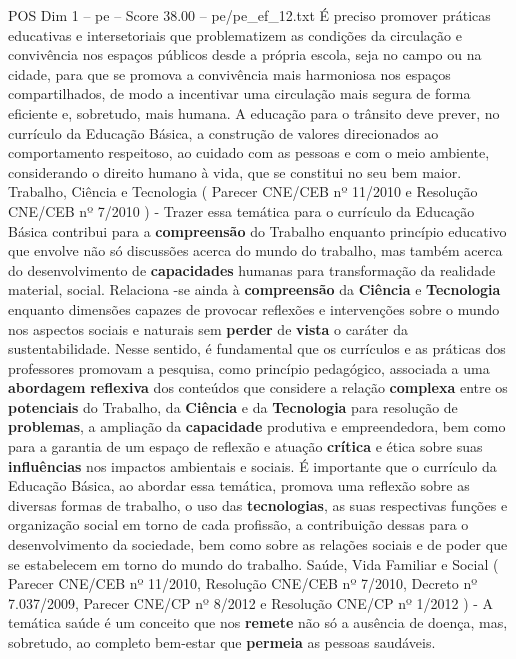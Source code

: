 \begin{textsample}{POS Dim 1 – pe – Score 38.00 – pe/pe\_ef\_12.txt}
É preciso promover práticas educativas e intersetoriais que problematizem as condições da circulação e convivência nos espaços públicos desde a própria escola, seja no campo ou na cidade, para que se promova a convivência mais harmoniosa nos espaços compartilhados, de modo a incentivar uma circulação mais segura de forma eficiente e, sobretudo, mais humana.
A educação para o trânsito deve prever, no currículo da Educação Básica, a construção de valores direcionados ao comportamento respeitoso, ao cuidado com as pessoas e com o meio ambiente, considerando o direito humano à vida, que se constitui no seu bem maior.
Trabalho, Ciência e Tecnologia ( Parecer CNE/CEB nº 11/2010 e Resolução CNE/CEB nº 7/2010 ) - Trazer essa temática para o currículo da Educação Básica contribui para a \textbf{compreensão} do Trabalho enquanto princípio educativo que envolve não só discussões acerca do mundo do trabalho, mas também acerca do desenvolvimento de \textbf{capacidades} humanas para transformação da realidade material, social.
Relaciona -se ainda à \textbf{compreensão} da \textbf{Ciência} e \textbf{Tecnologia} enquanto dimensões capazes de provocar reflexões e intervenções sobre o mundo nos aspectos sociais e naturais sem \textbf{perder} de \textbf{vista} o caráter da sustentabilidade.
Nesse sentido, é fundamental que os currículos e as práticas dos professores promovam a pesquisa, como princípio pedagógico, associada a uma \textbf{abordagem} \textbf{reflexiva} dos conteúdos que considere a relação \textbf{complexa} entre os \textbf{potenciais} do Trabalho, da \textbf{Ciência} e da \textbf{Tecnologia} para resolução de \textbf{problemas}, a ampliação da \textbf{capacidade} produtiva e empreendedora, bem como para a garantia de um espaço de reflexão e atuação \textbf{crítica} e ética sobre suas \textbf{influências} nos impactos ambientais e sociais.
É importante que o currículo da Educação Básica, ao abordar essa temática, promova uma reflexão sobre as diversas formas de trabalho, o uso das \textbf{tecnologias}, as suas respectivas funções e organização social em torno de cada profissão, a contribuição dessas para o desenvolvimento da sociedade, bem como sobre as relações sociais e de poder que se estabelecem em torno do mundo do trabalho.
Saúde, Vida Familiar e Social ( Parecer CNE/CEB nº 11/2010, Resolução CNE/CEB nº 7/2010, Decreto nº 7.037/2009, Parecer CNE/CP nº 8/2012 e Resolução CNE/CP nº 1/2012 ) - A temática saúde é um conceito que nos \textbf{remete} não só a ausência de doença, mas, sobretudo, ao completo bem-estar que \textbf{permeia} as pessoas saudáveis.

\end{textsample}
